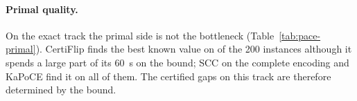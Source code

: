 \paragraph{Primal quality.}  On the exact track the primal side is not the
bottleneck (Table~\ref{tab:pace-primal}).  CertiFlip finds the best known
value on \numCfHit{} of the 200 instances although it spends a large part
of its \SI{60}{s} on the bound; SCC on the complete encoding and KaPoCE find it
on all of them.  The certified gaps on this track are therefore determined by
the bound.
